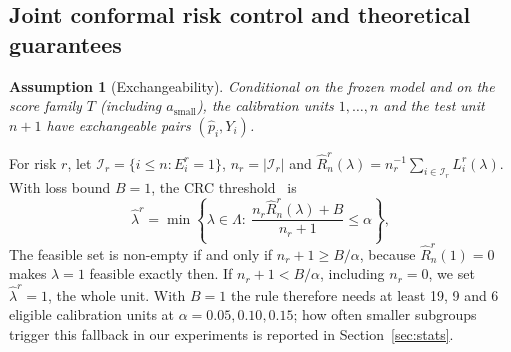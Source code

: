 \documentclass[sn-mathphys-num]{sn-jnl}%
\theoremstyle{thmstyleone}
\theoremstyle{thmstyletwo}
\theoremstyle{thmstylethree}
\newtheorem{assumption}{Assumption}
\newcommand{\1}{\mathbb{1}}
\newcommand{\lhat}{\hat\lambda}
\begin{document}
\subsection{Joint conformal risk control and theoretical guarantees}\label{sec:theory}

\begin{assumption}[Exchangeability]\label{ass:exch}
Conditional on the frozen model and on the score family $T$ (including $a_{\mathrm{small}}$), the calibration units $1,\dots,n$ and the test unit $n+1$ have exchangeable pairs $(\hat p_i,Y_i)$.
\end{assumption}

For risk $r$, let $\mathcal I_r=\{i\le n: E_i^r=1\}$, $n_r=|\mathcal I_r|$ and $\hat R_n^r(\lambda)=n_r^{-1}\sum_{i\in\mathcal I_r}L_i^r(\lambda)$. With loss bound $B=1$, the CRC threshold~\cite{angelopoulos2024crc} is
\begin{equation}\label{eq:crc}
\lhat^r=\min\left\{\lambda\in\Lambda:\ \frac{n_r\hat R_n^r(\lambda)+B}{n_r+1}\le\alpha\right\},
\end{equation}
The feasible set is non-empty if and only if $n_r+1\ge B/\alpha$, because $\hat R_n^r(1)=0$ makes $\lambda=1$ feasible exactly then. If $n_r+1<B/\alpha$, including $n_r=0$, we set $\lhat^r=1$, the whole unit. With $B=1$ the rule therefore needs at least 19, 9 and 6 eligible calibration units at $\alpha=0.05,0.10,0.15$; how often smaller subgroups trigger this fallback in our experiments is reported in Section~\ref{sec:stats}.
\end{document}
